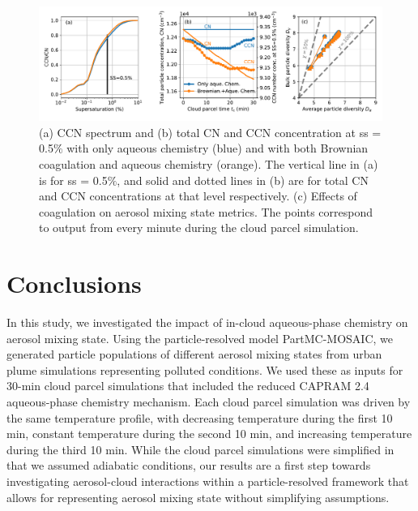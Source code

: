 \documentclass[edeposit,fullpage]{uiucthesis2009}
\begin{document}
\begin{figure}
    \centering
    \includegraphics[scale=0.5]{chap3_figs/fig13.pdf}
    \caption{(a) CCN spectrum and (b) total CN and CCN
      concentration at ss = 0.5$\%$ with only aqueous chemistry 
      (blue) and with both Brownian coagulation and aqueous chemistry
      (orange). The vertical line in (a) is for ss = 0.5$\%$, and
      solid and dotted lines in (b) are for total CN and CCN
      concentrations at that level respectively.  (c) Effects of
      coagulation on aerosol mixing state metrics. The points
      correspond to output from every minute during the cloud parcel
      simulation.}
    \label{fig:coag_ccn_chi}
\end{figure}

%
\section{Conclusions}
\label{sec:conclusions}
In this study, we investigated the impact of in-cloud aqueous-phase
chemistry on aerosol mixing state. Using the particle-resolved model
PartMC-MOSAIC, we generated particle populations of different aerosol
mixing states from urban plume simulations representing
polluted conditions. We used these as inputs for 30-min cloud parcel
simulations that included the reduced CAPRAM 2.4 aqueous-phase
chemistry mechanism. Each cloud parcel simulation was driven by the
same temperature profile, with decreasing temperature during the first
10 min, constant temperature during the second 10 min, and increasing
temperature during the third 10 min. While the cloud parcel
simulations were simplified in that we assumed adiabatic conditions,
our results are a first step towards investigating aerosol-cloud
interactions within a particle-resolved framework that allows for
representing aerosol mixing state without simplifying assumptions.
\end{document}
